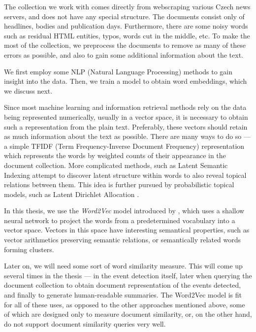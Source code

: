 The collection we work with comes directly from webscraping various Czech news servers, and does not have any special structure. The documents consist only of headlines, bodies and publication days. Furthermore, there are some noisy words such as residual HTML entities, typos, words cut in the middle, etc. To make the most of the collection, we preprocess the documents to remove as many of these errors as possible, and also to gain some additional information about the text.

We first employ some NLP (Natural Language Processing) methods to gain insight into the data. Then, we train a model to obtain word embeddings, which we discuss next.

Since most machine learning and information retrieval methods rely on the data being represented numerically, usually in a vector space, it is necessary to obtain such a representation from the plain text. Preferably, these vectors should retain as much information about the text as possible. There are many ways to do so --- a simple TFIDF (Term Frequency-Inverse Document Frequency) representation \citep{tfidf, information-retrieval} which represents the words by weighted counts of their appearance in the document collection. More complicated methods, such as Latent Semantic Indexing \citep{lsi} attempt to discover latent structure within words to also reveal topical relations between them. This idea is further pursued by probabilistic topical models, such as Latent Dirichlet Allocation \citep{lda}.

In this thesis, we use the \textit{Word2Vec} model introduced by \cite{word2vec, distributed-representations, linguistic-regularities}, which uses a shallow neural network to project the words from a predetermined vocabulary into a vector space. Vectors in this space have interesting semantical properties, such as vector arithmetics preserving semantic relations, or semantically related words forming clusters.

Later on, we will need some sort of word similarity measure. This will come up several times in the thesis --- in the event detection itself, later when querying the document collection to obtain document representation of the events detected, and finally to generate human-readable summaries. The Word2Vec model is fit for all of these uses, as opposed to the other approaches mentioned above, some of which are designed only to measure document similarity, or, on the other hand, do not support document similarity queries very well.


